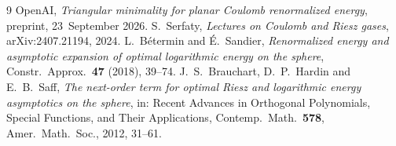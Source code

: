 \documentclass[11pt]{article}
\theoremstyle{definition}
\theoremstyle{remark}
\begin{document}
\begin{thebibliography}{9}
 OpenAI, \emph{Triangular minimality for planar Coulomb renormalized energy}, preprint, 23~September 2026.
 S.~Serfaty, \emph{Lectures on Coulomb and Riesz gases}, arXiv:2407.21194, 2024.
 L.~B\'etermin and \'E.~Sandier, \emph{Renormalized energy and asymptotic expansion of optimal
logarithmic energy on the sphere}, Constr.\ Approx.\ \textbf{47} (2018), 39--74.
 J.~S.~Brauchart, D.~P.~Hardin and E.~B.~Saff, \emph{The next-order term for optimal Riesz and
logarithmic energy asymptotics on the sphere}, in: Recent Advances in Orthogonal Polynomials, Special Functions, and Their
Applications, Contemp.\ Math.\ \textbf{578}, Amer.\ Math.\ Soc., 2012, 31--61.
\end{thebibliography}
\end{document}
